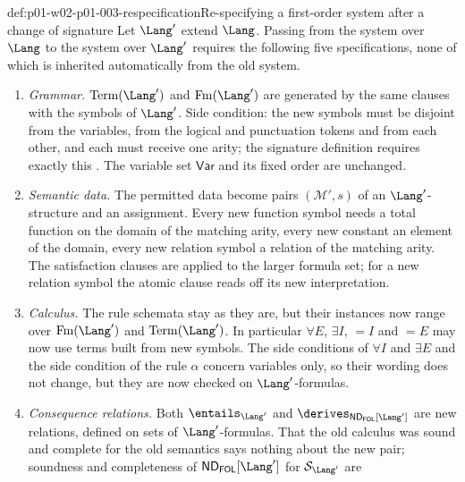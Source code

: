 \begin{hbmethod}{def:p01-w02-p01-003-respecification}{Re-specifying a first-order system after a change of signature}
Let \(\Lang'\) extend \(\Lang\). Passing from the system over \(\Lang\) to
the system over \(\Lang'\) requires the following five specifications, none
of which is inherited automatically from the old system.
\begin{enumerate}
  \item \emph{Grammar.} \(\operatorname{Term}(\Lang')\) and
        \(\operatorname{Fm}(\Lang')\) are generated by the same clauses with
        the symbols of \(\Lang'\). Side condition: the new symbols must be
        disjoint from the variables, from the logical and punctuation tokens
        and from each other, and each must receive one arity; the signature
        definition requires exactly this \cite[ch.~``First-Order Syntax'',
        definition ``First-order signature'']{FrozenFormalLogicLanguageChange}.
        The variable set \(\mathsf{Var}\) and its fixed order are unchanged.
  \item \emph{Semantic data.} The permitted data become pairs
        \((\mathcal M',s)\) of an \(\Lang'\)-structure and an assignment.
        Every new function symbol needs a total function on the domain of
        the matching arity, every new constant an element of the domain,
        every new relation symbol a relation of the matching arity. The
        satisfaction clauses are applied to the larger formula set; for a new
        relation symbol the atomic clause reads off its new interpretation.
  \item \emph{Calculus.} The rule schemata stay as they are, but their
        instances now range over \(\operatorname{Fm}(\Lang')\) and
        \(\operatorname{Term}(\Lang')\). In particular \(\forall E\),
        \(\exists I\), \(=I\) and \(=E\) may now use terms built from new
        symbols. The side conditions of \(\forall I\) and \(\exists E\) and
        the side condition of the rule \(\alpha\) concern variables only, so
        their wording does not change, but they are now checked on
        \(\Lang'\)-formulas.
  \item \emph{Consequence relations.} Both
        \(\entails_{\Lang'}\) and
        \(\derives_{\mathsf{ND}_{\mathsf{FOL}}[\Lang']}\) are new relations,
        defined on sets of \(\Lang'\)-formulas. That the old calculus was
        sound and complete for the old semantics says nothing about the new
        pair; soundness and completeness of
        \(\mathsf{ND}_{\mathsf{FOL}}[\Lang']\) for \(\mathcal S_{\Lang'}\) are

\end{enumerate}
\end{hbmethod}
